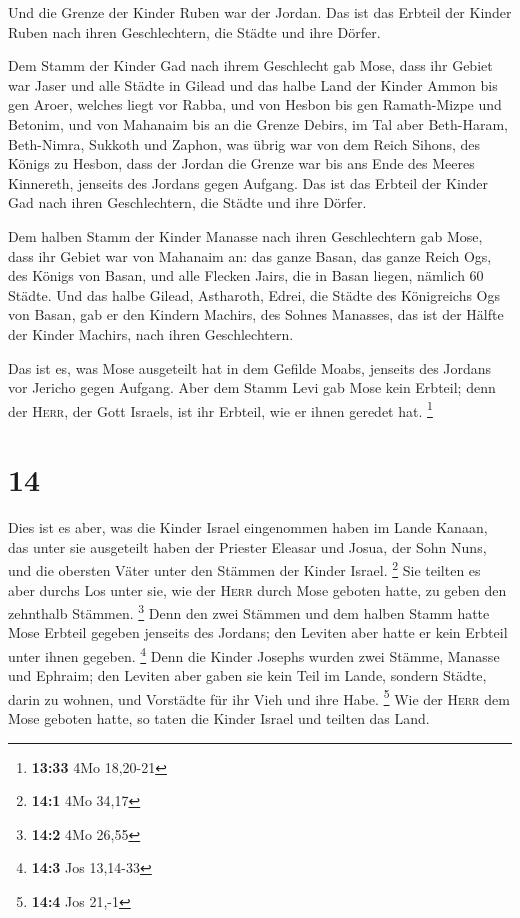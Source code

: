  Und die Grenze der Kinder Ruben war der Jordan. Das ist
das Erbteil der Kinder Ruben nach ihren Geschlechtern, die Städte und
ihre Dörfer.

 Dem Stamm der Kinder Gad nach ihrem Geschlecht gab Mose,
 dass ihr Gebiet war Jaser und alle Städte in Gilead und
das halbe Land der Kinder Ammon bis gen Aroer, welches liegt vor Rabba,
 und von Hesbon bis gen Ramath-Mizpe und Betonim, und von
Mahanaim bis an die Grenze Debirs,  im Tal aber
Beth-Haram, Beth-Nimra, Sukkoth und Zaphon, was übrig war von dem Reich
Sihons, des Königs zu Hesbon, dass der Jordan die Grenze war bis ans
Ende des Meeres Kinnereth, jenseits des Jordans gegen Aufgang.
 Das ist das Erbteil der Kinder Gad nach ihren
Geschlechtern, die Städte und ihre Dörfer.

 Dem halben Stamm der Kinder Manasse nach ihren
Geschlechtern gab Mose,  dass ihr Gebiet war von Mahanaim
an: das ganze Basan, das ganze Reich Ogs, des Königs von Basan, und alle
Flecken Jairs, die in Basan liegen, nämlich 60 Städte. 
Und das halbe Gilead, Astharoth, Edrei, die Städte des Königreichs Ogs
von Basan, gab er den Kindern Machirs, des Sohnes Manasses, das ist der
Hälfte der Kinder Machirs, nach ihren Geschlechtern.

 Das ist es, was Mose ausgeteilt hat in dem Gefilde
Moabs, jenseits des Jordans vor Jericho gegen Aufgang. 
Aber dem Stamm Levi gab Mose kein Erbteil; denn der \textsc{Herr}, der
Gott Israels, ist ihr Erbteil, wie er ihnen geredet hat. \footnote{\textbf{13:33}
  4Mo 18,20-21}

\hypertarget{section-5}{%
\section{14}\label{section-5}}

 Dies ist es aber, was die Kinder Israel eingenommen haben
im Lande Kanaan, das unter sie ausgeteilt haben der Priester Eleasar und
Josua, der Sohn Nuns, und die obersten Väter unter den Stämmen der
Kinder Israel. \footnote{\textbf{14:1} 4Mo 34,17}  Sie
teilten es aber durchs Los unter sie, wie der \textsc{Herr} durch Mose
geboten hatte, zu geben den zehnthalb Stämmen. \footnote{\textbf{14:2}
  4Mo 26,55}  Denn den zwei Stämmen und dem halben Stamm
hatte Mose Erbteil gegeben jenseits des Jordans; den Leviten aber hatte
er kein Erbteil unter ihnen gegeben. \footnote{\textbf{14:3} Jos
  13,14-33}  Denn die Kinder Josephs wurden zwei Stämme,
Manasse und Ephraim; den Leviten aber gaben sie kein Teil im Lande,
sondern Städte, darin zu wohnen, und Vorstädte für ihr Vieh und ihre
Habe. \footnote{\textbf{14:4} Jos 21,-1}  Wie der
\textsc{Herr} dem Mose geboten hatte, so taten die Kinder Israel und
teilten das Land.

